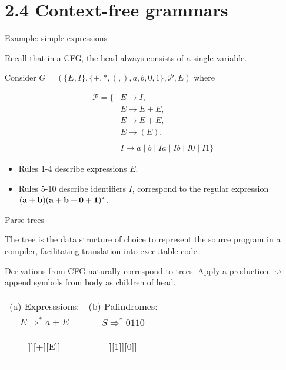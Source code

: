 \documentclass[handout]{beamer}
\begin{document}
\section{2.4 Context-free grammars}


\begin{frame}{Example: simple expressions}

	Recall that in a CFG, the head always consists of a single variable.

	\medskip

	Consider $G=(\{E,I\},\{+,*,(,),a,b,0,1\},\mathcal P,E)$ where
	
	\vspace{-15pt}
	\begin{align*}
		\mathcal P=\{&E\rightarrow I,\\
        &E\rightarrow E+E,\\
        &E\rightarrow E+E,\\
        &E\rightarrow (E),\\ \\
		&I\rightarrow a\mid b\mid Ia\mid Ib\mid I0\mid I1\}
	\end{align*}
	
	\begin{itemize}
		\item Rules 1-4 describe expressions $E$.
		\item Rules 5-10 describe identifiers $I$, correspond to the regular expression 
		$(\bf{a}+\bf{b})(\bf{a}+\bf{b}+\bf{0}+\bf{1})^* $.
	\end{itemize}

\end{frame}


\begin{frame}{Parse trees}

	The tree is the data structure of choice to represent the source program in a compiler, facilitating translation into executable code.

	Derivations from CFG naturally correspond to trees. Apply a production $\rightsquigarrow$ append symbols from body as children of head.

	\begin{center}
	\begin{tabular}{c c}
		(a) Expresssions:\hspace{2cm} &
		(b) Palindromes:\hspace{2cm} \\
		\alert{$E\Rightarrow^* a+E$} &
		\alert{$S\Rightarrow^* 0110$}\\
		\begin{forest}
			[E[E[I[a]]][+][E]]
		\end{forest}		
		&		
		\begin{forest}
			[S[0][S[1][S[$\epsilon$]][1]][0]]
		\end{forest}
	\end{tabular}
	\end{center}

\end{frame}
\end{document}
